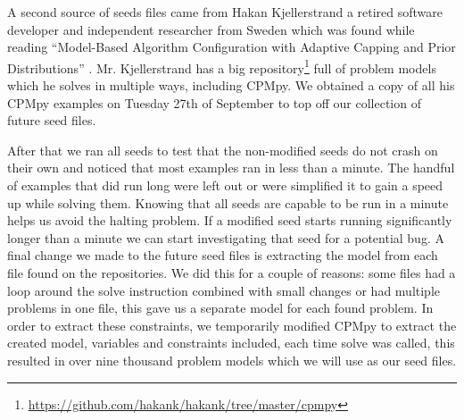 A second source of seeds files came from Hakan Kjellerstrand a retired software developer and independent researcher from Sweden which was found while reading “Model-Based Algorithm Configuration with Adaptive Capping and Prior Distributions” \cite{18bleukx2022model}. Mr. Kjellerstrand has a big repository\footnote{\url{https://github.com/hakank/hakank/tree/master/cpmpy}} full of problem models which he solves in multiple ways, including CPMpy. We obtained a copy of all his CPMpy examples on Tuesday 27th of September to top off our collection of future seed files.


After that we ran all seeds to test that the non-modified seeds do not crash on their own and noticed that most examples ran in less than a minute. The handful of examples that did run long were left out or were simplified it to gain a speed up while solving them. Knowing that all seeds are capable to be run in a minute helps us avoid the halting problem. If a modified seed starts running significantly longer than a minute we can start investigating that seed for a potential bug. A final change we made to the future seed files is extracting the model from each file found on the repositories. We did this for a couple of reasons: some files had a loop around the solve instruction combined with small changes or had multiple problems in one file, this gave us a separate model for each found problem. In order to extract these constraints, we temporarily modified CPMpy to extract the created model, variables and constraints included, each time solve was called, this resulted in over nine thousand problem models which we will use as our seed files.



